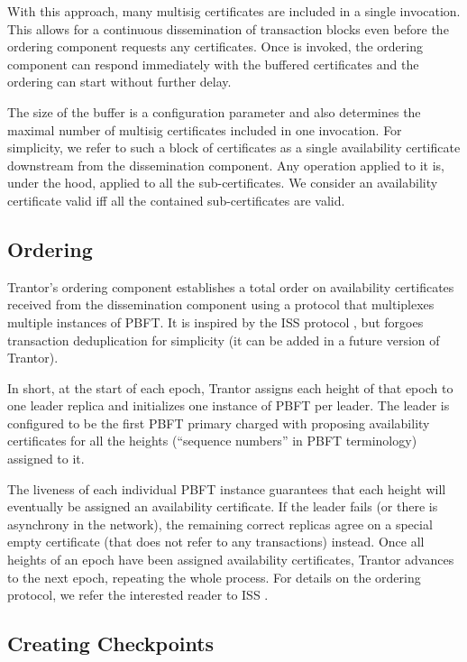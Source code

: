 \documentclass{article}
\begin{document}
With this approach, many multisig certificates are included in a single  invocation.
This allows for a continuous dissemination of transaction blocks
even before the ordering component requests any certificates.
Once  is invoked, the ordering component can respond immediately with the buffered certificates
and the ordering can start without further delay.

The size of the buffer is a configuration parameter
and also determines the maximal number of multisig certificates included in one  invocation.
For simplicity, we refer to such a block of certificates as a single availability certificate
downstream from the dissemination component.
Any operation applied to it is, under the hood, applied to all the sub-certificates.
We consider an availability certificate valid iff all the contained sub-certificates are valid.

\subsection{Ordering}

Trantor’s ordering component establishes a total order on availability certificates
received from the dissemination component using a protocol that multiplexes multiple instances of PBFT.
It is inspired by the ISS protocol \cite{iss}, but forgoes transaction deduplication for simplicity
(it can be added in a future version of Trantor).

In short, at the start of each epoch, Trantor assigns each height of that epoch to one leader replica
and initializes one instance of PBFT per leader.
The leader is configured to be the first PBFT primary charged with proposing availability certificates
for all the heights (“sequence numbers” in PBFT terminology) assigned to it.

The liveness of each individual PBFT instance guarantees
that each height will eventually be assigned an availability certificate.
If the leader fails (or there is asynchrony in the network),
the remaining correct replicas agree on a special empty certificate (that does not refer to any transactions) instead. Once all heights of an epoch have been assigned availability certificates,
Trantor advances to the next epoch, repeating the whole process.
For details on the ordering protocol, we refer the interested reader to ISS \cite{iss}.

\subsection{Creating Checkpoints}
\label{sec:creating-checkpoints}
\end{document}
